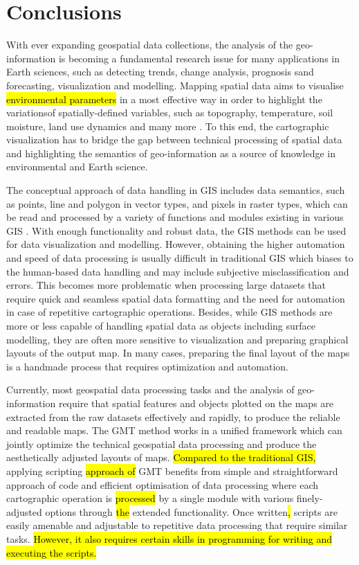 \documentclass[ijgi,article,submit,pdftex,moreauthors]{Definitions/mdpi}
\begin{document}
\section{Conclusions}

With ever expanding geospatial data collections, the analysis of the geo-information is becoming a fundamental research issue for many applications in Earth sciences, such as detecting trends, change analysis, prognosis sand forecasting, visualization and modelling. Mapping spatial data aims to visualise \hl{environmental parameters} in a most effective way in order to highlight the variations\hl{}of spatially-defined variables, such as topography, temperature, soil moisture, land use dynamics and many more \cite{Moreri,Mpofu,Lemenkova202203,Ramberg2006a}. To this end, the cartographic visualization has to bridge the gap between technical processing of spatial data and highlighting the semantics of geo-information as a source of knowledge in environmental and Earth science. 

The conceptual approach of data handling in GIS includes data semantics, such as points, line and polygon in vector types, and pixels in raster types, which can be read and processed by a variety of functions and modules existing in various GIS \cite{ijgi11040257,Lemenkova202140,ijgi9110631}. With enough functionality and robust data, the GIS methods can be used for data visualization and modelling. However, obtaining the higher automation and speed of data processing is usually difficult in traditional GIS which biases to the human-based data handling and may include subjective misclassification and errors. This becomes more problematic when processing large datasets that require quick and seamless spatial data formatting and the need for automation in case of repetitive cartographic operations. Besides, while GIS methods are more or less capable of handling spatial data as objects including surface modelling, they are often more sensitive to visualization and preparing graphical layouts of the output map. In many cases, preparing the final layout of the maps is a handmade process that requires optimization and automation.


Currently, most geospatial data processing tasks and the analysis of geo-information require that spatial features and objects plotted on the maps are extracted from the raw datasets effectively and rapidly, to produce the reliable and readable maps. The GMT method works in a unified framework which can jointly optimize the technical geospatial data processing and produce the aesthetically adjusted layouts of maps. \hl{Compared to the traditional GIS,} applying scripting \hl{approach of }GMT benefits from simple and straightforward approach of code and efficient optimisation of data processing where each cartographic operation is \hl{processed} by a single module with various finely-adjusted options through \hl{the }extended functionality. Once written\hl{, }scripts are easily amenable and adjustable to repetitive data processing that require similar tasks. \hl{However, it also requires certain skills in programming for writing and executing the scripts.}
\end{document}
